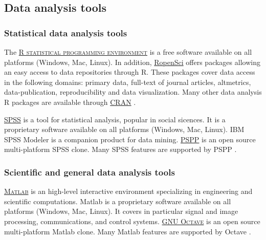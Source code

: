 \subsection{Data analysis tools}

\label{daanto}

\subsubsection{Statistical data analysis tools}
\noindent {} The \textsc{\href{http://r-project.org}{R statistical programming environment}} is a free software available on all platforms (Windows, Mac, Linux). In addition, \href{http://ropensci.org}{RopenSci} offers packages allowing an easy access to data repositories through R. These packages cover data access in the following domains: primary data, full-text of journal articles, altmetrics, data-publication, reproducibility and data visualization. Many other data analysis R packages are available through \href{http://cran.r-project.org/}{CRAN} \cite{ropensci.org_ropensci_2015,r_project_r:_2015}.

\vspace{0.4cm}

\noindent {} \textsc{\href{http://www.ibm.com/software/analytics/spss/}{SPSS}} is a tool for statistical analysis, popular in social sicences. It is a proprietary software available on all platforms (Windows, Mac, Linux). IBM SPSS Modeler is a companion product for data mining.  \textsc{\href{http://www.gnu.org/software/pspp/}{PSPP}} is an open source multi-platform SPSS clone. Many SPSS features are supported by PSPP \cite{ibm_ibm_2015,gnu_pspp_2015}.

\subsubsection{Scientific and general data analysis tools}
\noindent {} \textsc{\href{https://ch.mathworks.com/products/matlab/}{Matlab}} is an high-level interactive environment specializing in engineering and scientific computations. Matlab is a proprietary software available on all platforms (Windows, Mac, Linux). It covers in particular signal and image processing, communications, and control systems.  \textsc{\href{http://www.gnu.org/software/octave/}{GNU Octave}} is an open source multi-platform Matlab clone. Many Matlab features are supported by Octave \cite{gnu_gnu_2015,mathworks_matlab_2015}.

